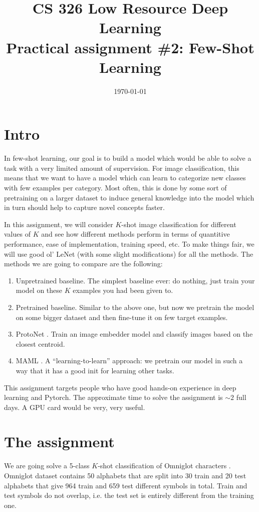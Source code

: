 \documentclass[letterpaper,12pt]{article}
\title{
CS 326 Low Resource Deep Learning
\\
Practical assignment \#2: Few-Shot Learning
}
\date{\today}
\begin{document}
\maketitle

\section{Intro}

In few-shot learning, our goal is to build a model which would be able to solve a task with a very limited amount of supervision.
For image classification, this means that we want to have a model which can learn to categorize new classes with few examples per category.
Most often, this is done by some sort of pretraining on a larger dataset to induce general knowledge into the model which in turn should help to capture novel concepts faster.

In this assignment, we will consider $K$-shot image classification for different values of $K$ and see how different methods perform in terms of quantitive performance, ease of implementation, training speed, etc.
To make things fair, we will use good ol' LeNet (with some slight modifications) for all the methods.
The methods we are going to compare are the following:
\begin{enumerate}
    \item Unpretrained baseline. The simplest baseline ever: do nothing, just train your model on these $K$ examples you had been given to.
    \item Pretrained baseline. Similar to the above one, but now we pretrain the model on some bigger dataset and then fine-tune it on few target examples.
    \item ProtoNet \cite{ProtoNet}. Train an image embedder model and classify images based on the closest centroid.
    \item MAML \cite{MAML}. A ``learning-to-learn'' approach: we pretrain our model in such a way that it has a good init for learning other tasks.
\end{enumerate}

This assignment targets people who have good hands-on experience in deep learning and Pytorch.
The approximate time to solve the assignment is $\sim 2$ full days.
A GPU card would be very, very useful.

\section{The assignment}
We are going solve a 5-class $K$-shot classification of Omniglot characters \cite{Omniglot}.
Omniglot dataset contains 50 alphabets that are split into 30 train and 20 test alphabets that give  964 train and 659 test different symbols in total.
Train and test symbols do not overlap, i.e. the test set is entirely different from the training one.
\end{document}
